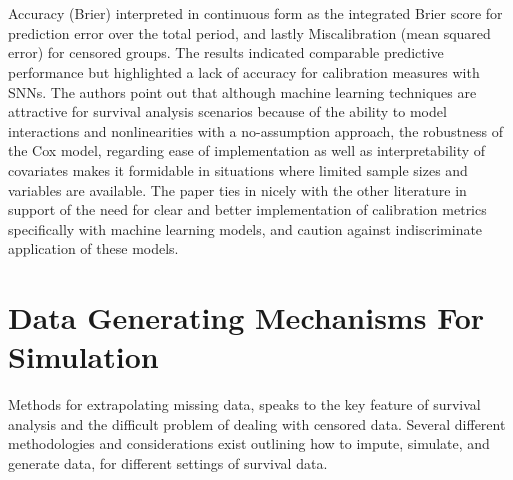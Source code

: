 \\\\
\noindent Accuracy (Brier) interpreted in continuous form as the integrated Brier score for prediction error over the total period, and lastly Miscalibration (mean squared error) for censored groups. \parencite{kantidakis_simulation_2021} The results indicated comparable predictive performance but highlighted a lack of accuracy for calibration measures with SNNs. The authors point out that although machine learning techniques are attractive for survival analysis scenarios because of the ability to model interactions and nonlinearities with a no-assumption approach, the robustness of the Cox model, regarding ease of implementation as well as interpretability of covariates makes it formidable in situations where limited sample sizes and variables are available. The paper ties in nicely with the other literature in support of the need for clear and better implementation of calibration metrics specifically with machine learning models, and caution against indiscriminate application of these models.

\section{Data Generating Mechanisms For Simulation}
\noindent Methods for extrapolating missing data, speaks to the key feature of survival analysis and the difficult problem of dealing with censored data. Several different methodologies and considerations exist outlining how to impute, simulate, and generate data, for different settings of survival data.

